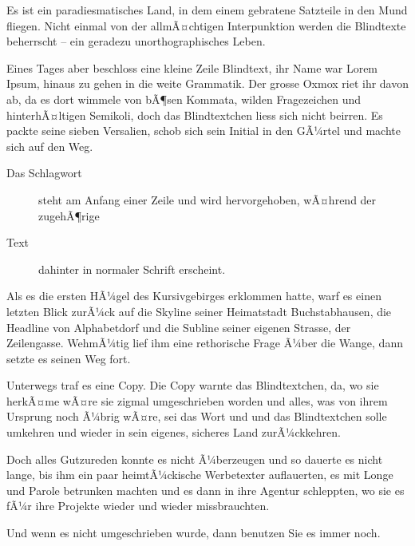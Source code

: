 \documentclass{scrartcl}
\begin{document}
  Es ist ein paradiesmatisches Land, in dem einem gebratene Satzteile in den Mund fliegen. Nicht einmal von der allmÃ¤chtigen Interpunktion werden die Blindtexte beherrscht -- ein geradezu unorthographisches Leben.

  Eines Tages aber beschloss eine kleine Zeile Blindtext, ihr Name war Lorem Ipsum, hinaus zu gehen in die weite Grammatik. Der grosse Oxmox riet ihr davon ab, da es dort wimmele von bÃ¶sen Kommata, wilden Fragezeichen und hinterhÃ¤ltigen Semikoli, doch das Blindtextchen liess sich nicht beirren. Es packte seine sieben Versalien, schob sich sein Initial in den GÃ¼rtel und machte sich auf den Weg.

  \begin{description}
    \item[Das Schlagwort] steht am Anfang einer Zeile und wird hervorgehoben, wÃ¤hrend der zugehÃ¶rige
    \item[Text] dahinter in normaler Schrift erscheint.
  \end{description}

  Als es die ersten HÃ¼gel des Kursivgebirges erklommen hatte, warf es einen letzten Blick zurÃ¼ck auf die Skyline seiner Heimatstadt Buchstabhausen, die Headline von Alphabetdorf und die Subline seiner eigenen Strasse, der Zeilengasse. WehmÃ¼tig lief ihm eine rethorische Frage Ã¼ber die Wange, dann setzte es seinen Weg fort.

  Unterwegs traf es eine Copy. Die Copy warnte das Blindtextchen, da, wo sie herkÃ¤me wÃ¤re sie zigmal umgeschrieben worden und alles, was von ihrem Ursprung noch Ã¼brig wÃ¤re, sei das Wort und und das Blindtextchen solle umkehren und wieder in sein eigenes, sicheres Land zurÃ¼ckkehren.

  Doch alles Gutzureden konnte es nicht Ã¼berzeugen und so dauerte es nicht lange, bis ihm ein paar heimtÃ¼ckische Werbetexter auflauerten, es mit Longe und Parole betrunken machten und es dann in ihre Agentur schleppten, wo sie es fÃ¼r ihre Projekte wieder und wieder missbrauchten.

  Und wenn es nicht umgeschrieben wurde, dann benutzen Sie es immer noch.
\end{document}
